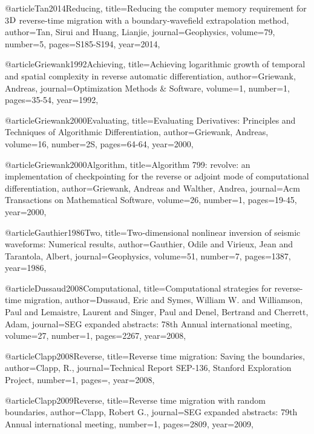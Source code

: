 @article{Tan2014Reducing,
  title={Reducing the computer memory requirement for 3$\textnormal{D}$ reverse-time migration with a boundary-wavefield extrapolation method},
  author={Tan, Sirui and Huang, Lianjie},
  journal={Geophysics},
  volume={79},
  number={5},
  pages={S185-S194},
  year={2014},
}



@article{Griewank1992Achieving,
  title={Achieving logarithmic growth of temporal and spatial complexity in reverse automatic differentiation},
  author={Griewank, Andreas},
  journal={Optimization Methods \& Software},
  volume={1},
  number={1},
  pages={35-54},
  year={1992},
}

@article{Griewank2000Evaluating,
  title={Evaluating Derivatives: Principles and Techniques of Algorithmic Differentiation},
  author={Griewank, Andreas},
  volume={16},
  number={2S},
  pages={64-64},
  year={2000},
}

@article{Griewank2000Algorithm,
  title={Algorithm 799: revolve: an implementation of checkpointing for the reverse or adjoint mode of computational differentiation},
  author={Griewank, Andreas and Walther, Andrea},
  journal={Acm Transactions on Mathematical Software},
  volume={26},
  number={1},
  pages={19-45},
  year={2000},
}

@article{Gauthier1986Two,
  title={Two‐dimensional nonlinear inversion of seismic waveforms: Numerical results},
  author={Gauthier, Odile and Virieux, Jean and Tarantola, Albert},
  journal={Geophysics},
  volume={51},
  number={7},
  pages={1387},
  year={1986},
}

@article{Dussaud2008Computational,
  title={Computational strategies for reverse-time migration},
  author={Dussaud, Eric and Symes, William W. and Williamson, Paul and Lemaistre, Laurent and Singer, Paul and Denel, Bertrand and Cherrett, Adam},
  journal={SEG expanded abstracts: 78th Annual international meeting},
  volume={27},
  number={1},
  pages={2267},
  year={2008},
}

@article{Clapp2008Reverse,
  title={Reverse time migration: Saving the boundaries},
  author={Clapp, R.},
  journal={Technical Report SEP-136, Stanford Exploration Project},
  number={1},
  pages={},
  year={2008},
}

@article{Clapp2009Reverse,
  title={Reverse time migration with random boundaries},
  author={Clapp, Robert G.},
  journal={SEG expanded abstracts: 79th Annual international meeting},
  number={1},
  pages={2809},
  year={2009},
}

